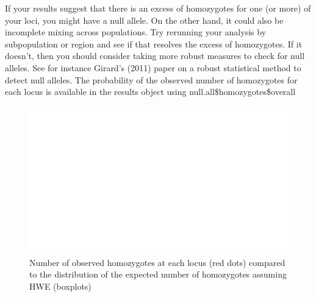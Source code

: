 \documentclass[a4paper]{scrartcl}\usepackage[]{graphicx}\usepackage[]{color}
\makeatletter
\def\maxwidth{ %
  \ifdim\Gin@nat@width>\linewidth
    \linewidth
  \else
    \Gin@nat@width
  \fi
}
\newenvironment{kframe}{%
 \def\at@end@of@kframe{}%
 \ifinner\ifhmode%
  \def\at@end@of@kframe{\end{minipage}}%
  \begin{minipage}{\columnwidth}%
 \fi\fi%
 \def\FrameCommand##1{\hskip\@totalleftmargin \hskip-\fboxsep
 \colorbox{shadecolor}{##1}\hskip-\fboxsep
     \hskip-\linewidth \hskip-\@totalleftmargin \hskip\columnwidth}%
 \MakeFramed {\advance\hsize-\width
   \@totalleftmargin\z@ \linewidth\hsize
   \@setminipage}}%
 {\par\unskip\endMakeFramed%
 \at@end@of@kframe}
\newenvironment{knitrout}{}{} %
\makeatother
\begin{document}
If your results suggest that there is an excess of homozygotes for one (or more) of your loci, you might have a null allele. On the other hand, it could also be incomplete mixing across populations. Try rerunning your analysis by subpopulation or region and see if that resolves the excess of homozygotes. If it doesn't, then you should consider taking more robust measures to check for null alleles. See for instance Girard's (2011) paper on a robust statistical method to detect null alleles.  
\newline
\newline The probability of the observed number of homozygotes for each locus is available in the results object using null.all\$homozygotes\$overall
\begin{knitrout}
\color{fgcolor}\begin{kframe}


{\ttfamily\noindent\bfseries\color{errorcolor}{\#\# Error in factor(X2): object 'X2' not found}}\end{kframe}\begin{figure}
\includegraphics[width=\maxwidth]{PopGenReport-null_all_overall_ho-1} \caption[Number of observed homozygotes at each locus (red dots) compared to the distribution of the expected number of homozygotes assuming HWE (boxplots)]{Number of observed homozygotes at each locus (red dots) compared to the distribution of the expected number of homozygotes assuming HWE (boxplots)}\label{fig:null_all_overall_ho}
\end{figure}


\end{knitrout}
\FloatBarrier
\end{document}
